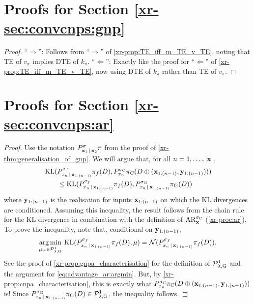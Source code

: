 \documentclass[12pt, twoside]{report}
\newcommand{\xrprefix}[1]{xr-#1}
\begin{document}
\section{Proofs for Section \ref{\xrprefix{sec:convcnps:gnp}}}
\label{sec:proofs_convcnps:gnp}

\begin{proof}

    ``$\Rightarrow$'': Follows from ``$\Rightarrow$'' of \cref{\xrprefix{prop:TE_iff_m_TE_v_TE}}, noting that TE of $v_\pi$ implies DTE of $k_\pi$.
    ``$\Leftarrow$'': Exactly like the proof for ``$\Leftarrow$'' of \cref{\xrprefix{prop:TE_iff_m_TE_v_TE}}, now using DTE of $k_\pi$ rather than TE of $v_\pi$.
\end{proof}


\section{Proofs for Section \ref{\xrprefix{sec:convcnps:ar}}}
\label{sec:proofs_convcnps:ar}

\begin{proof}
    Use the notation $P_{\mathbf{x}_1 \,|\, \mathbf{x}_2}^\sigma \pi$ from the proof of \cref{\xrprefix{thm:generalisation_of_gnp}}.
    We will argue that, for all $n = 1, \ldots, \lvert\mathbf{x}\rvert$,
    \begin{align}
        &\KL(
            P_{x_n \cond \vx_{1:(n-1)}}^{\sigma_f} \pi_f(D),
            P_{x_n}^{\sigma\ss{C}} \pi\ss{C}(D \oplus (\vx_{1:(n-1)}, \vy_{1:(n - 1)}))
        ) \nonumber \\
        &\qquad\le \KL(
            P_{x_n \cond \vx_{1:(n-1)}}^{\sigma_f} \pi_f(D),
            P_{x_n \cond \vx_{1:(n-1)}}^{\sigma\ss{G}} \pi\ss{G}(D)
        )
    \end{align}
    where $\mathbf{y}_{1:(n-1)}$ is the realisation for inputs $\mathbf{x}_{1:(n-1)}$ on which the KL divergences are conditioned.
    Assuming this inequality, the result follows from the chain rule for the KL divergence in combination with the definition of $\AR_\vx^{\sigma\ss{C}}$ (\cref{\xrprefix{proc:ar}}).
    To prove the inequality, note that,
    conditional on $\mathbf{y}_{1:(n-1)}$,%
    \begin{equation} \label{eq:advantage_ar:argmin}
        \argmin_{\mu\ss{G} \in \Pc\ss{$\lambda$,G}^1}\,
        \KL(
            P_{x_n \cond \vx_{1:(n-1)}}^{\sigma_f} \pi_f(D),
            \mu
        )
        = \Normal(P_{x_n \cond \vx_{1:(n-1)}}^{\sigma_f} \pi_f(D)).
    \end{equation}
    See the proof of \cref{\xrprefix{prop:gnpa_characterisation}} for the definition of $\Pc\ss{$\lambda$,G}^1$ and the argument for \eqref{eq:advantage_ar:argmin}.
    But, by \cref{\xrprefix{prop:cnpa_characterisation}}, this is exactly what 
    $P_{x_n}^{\sigma\ss{C}} \pi\ss{C}(D \oplus (\vx_{1:(n-1)}, \vy_{1:(n - 1)}))$
    is!
    Since $P_{x_n \cond \vx_{1:(n-1)}}^{\sigma\ss{G}} \pi\ss{G}(D) \in \Pc\ss{$\lambda$,G}^1$, the inequality follows.
\end{proof}
\end{document}

